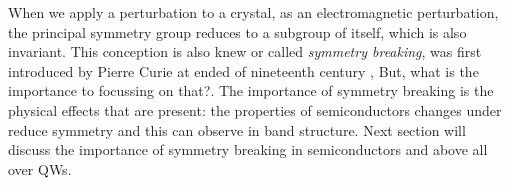 
When we apply a perturbation to a crystal, as an electromagnetic perturbation, the principal symmetry group reduces to a subgroup of itself, which is also invariant.
This conception is also knew or called  \emph{symmetry breaking}, was first introduced by Pierre Curie at ended of nineteenth century \cite{curie1894symetrie,sep-symmetry-breaking},
But, what is the importance to focussing on that?. The importance of symmetry breaking is the physical effects that
are present: the properties of semiconductors changes under reduce symmetry and this can observe in band structure. Next section will discuss the importance of symmetry breaking in semiconductors and above all over \gls{QW}s.
